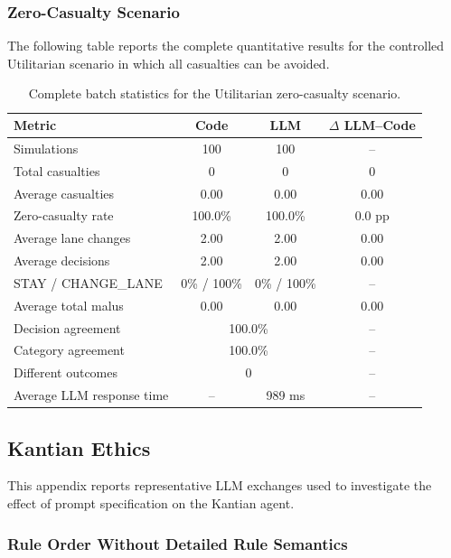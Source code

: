 \documentclass[10pt,a4paper]{article}
\begin{document}
\subsubsection{Zero-Casualty Scenario}

The following table reports the complete quantitative results for the
controlled Utilitarian scenario in which all casualties can be avoided.

\begin{table}[H]
\centering
\small
\begin{tabular}{lccc}
\toprule
Metric & Code & LLM & $\Delta$ LLM--Code \\
\midrule
Simulations & 100 & 100 & -- \\
Total casualties & 0 & 0 & 0 \\
Average casualties & 0.00 & 0.00 & 0.00 \\
Zero-casualty rate & 100.0\% & 100.0\% & 0.0 pp \\
Average lane changes & 2.00 & 2.00 & 0.00 \\
Average decisions & 2.00 & 2.00 & 0.00 \\
STAY / CHANGE\_LANE & 0\% / 100\% & 0\% / 100\% & -- \\
Average total malus & 0.00 & 0.00 & 0.00 \\
Decision agreement & \multicolumn{2}{c}{100.0\%} & -- \\
Category agreement & \multicolumn{2}{c}{100.0\%} & -- \\
Different outcomes & \multicolumn{2}{c}{0} & -- \\
Average LLM response time & -- & 989 ms & -- \\
\bottomrule
\end{tabular}
\caption{Complete batch statistics for the Utilitarian zero-casualty scenario.}
\label{tab:app-utilitarian-zero-casualty}
\end{table}


\subsection{Kantian Ethics}
\label{app:kant-prompt-analysis}

This appendix reports representative LLM exchanges used to investigate the
effect of prompt specification on the Kantian agent.

\subsubsection{Rule Order Without Detailed Rule Semantics}
\end{document}
